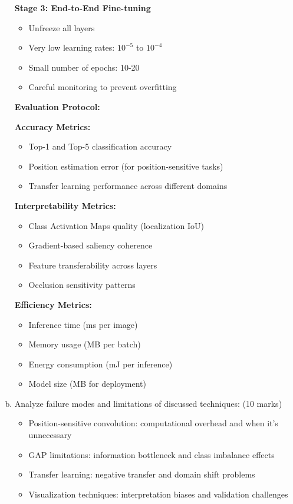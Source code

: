 \documentclass[12pt]{article}
\begin{document}
\begin{enumerate}[(a)]
{    \textbf{Stage 3: End-to-End Fine-tuning}
    \begin{itemize}
        \item Unfreeze all layers
        \item Very low learning rates: $10^{-5}$ to $10^{-4}$
        \item Small number of epochs: 10-20
        \item Careful monitoring to prevent overfitting
    \end{itemize}
    
    \textbf{Evaluation Protocol:}
    
    \textbf{Accuracy Metrics:}
    \begin{itemize}
        \item Top-1 and Top-5 classification accuracy
        \item Position estimation error (for position-sensitive tasks)
        \item Transfer learning performance across different domains
    \end{itemize}
    
    \textbf{Interpretability Metrics:}
    \begin{itemize}
        \item Class Activation Maps quality (localization IoU)
        \item Gradient-based saliency coherence
        \item Feature transferability across layers
        \item Occlusion sensitivity patterns
    \end{itemize}
    
    \textbf{Efficiency Metrics:}
    \begin{itemize}
        \item Inference time (ms per image)
        \item Memory usage (MB per batch)
        \item Energy consumption (mJ per inference)
        \item Model size (MB for deployment)
    \end{itemize}
    }
    
    \item Analyze failure modes and limitations of discussed techniques: \hfill (10 marks)
    \begin{itemize}
        \item Position-sensitive convolution: computational overhead and when it's unnecessary
        \item GAP limitations: information bottleneck and class imbalance effects
        \item Transfer learning: negative transfer and domain shift problems
        \item Visualization techniques: interpretation biases and validation challenges
    \end{itemize}
    

\end{enumerate}
\end{document}
